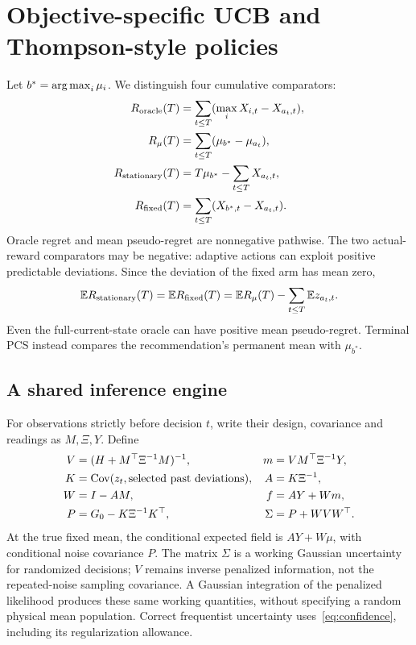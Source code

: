 \section{Objective-specific UCB and Thompson-style policies}
Let $b^*=\operatorname*{arg\,max}_i\mu_i$. We distinguish four cumulative comparators:
\begin{align}
R_{\rm oracle}(T)&=\sum_{t\le T}(\max_iX_{i,t}-X_{a_t,t}),\nonumber\\
R_\mu(T)&=\sum_{t\le T}(\mu_{b^*}-\mu_{a_t}),\label{eq:three-regrets}\\
R_{\rm stationary}(T)&=T\mu_{b^*}-\sum_{t\le T}X_{a_t,t},\nonumber\\
R_{\rm fixed}(T)&=\sum_{t\le T}(X_{b^*,t}-X_{a_t,t}).\nonumber
\end{align}
Oracle regret and mean pseudo-regret are nonnegative pathwise. The two actual-reward comparators may be negative: adaptive actions can exploit positive predictable deviations. Since the deviation of the fixed arm has mean zero,
\begin{equation}
\mathbb E R_{\rm stationary}(T)=\mathbb E R_{\rm fixed}(T)
=\mathbb E R_\mu(T)-\sum_{t\le T}\mathbb E z_{a_t,t}.
\end{equation}
Even the full-current-state oracle can have positive mean pseudo-regret. Terminal PCS instead compares the recommendation's permanent mean with $\mu_{b^*}$.

\subsection{A shared inference engine}
For observations strictly before decision $t$, write their design, covariance and readings as $M,\Xi,Y$. Define
\begin{align}
V&=(H+M^\top\Xi^{-1}M)^{-1},&m&=VM^\top\Xi^{-1}Y,\nonumber\\
K&=\operatorname{Cov}(z_t,\hbox{selected past deviations}),&A&=K\Xi^{-1},\nonumber\\
W&=I-AM,&f&=AY+Wm,\label{eq:forecast-working}\\
P&=G_0-K\Xi^{-1}K^\top,&\Sigma&=P+WVW^\top.\nonumber
\end{align}
At the true fixed mean, the conditional expected field is $AY+W\mu$, with conditional noise covariance $P$. The matrix $\Sigma$ is a working Gaussian uncertainty for randomized decisions; $V$ remains inverse penalized information, not the repeated-noise sampling covariance. A Gaussian integration of the penalized likelihood produces these same working quantities, without specifying a random physical mean population. Correct frequentist uncertainty uses~\eqref{eq:confidence}, including its regularization allowance.


